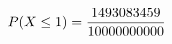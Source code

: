 \documentclass[preview]{standalone}
\begin{document}
\begin{align*}
\special{dvisvgm:raw <g id='unique000'>}P(X\le1)=\frac{1493083459}{10000000000}\special{dvisvgm:raw </g>}
\end{align*}
\end{document}
